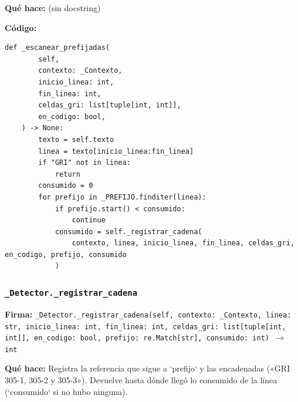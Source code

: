 \documentclass[11pt,a4paper]{article}
\begin{document}
\textbf{Qué hace:} (sin docstring)

\textbf{Código:}
\begin{lstlisting}
def _escanear_prefijadas(
        self,
        contexto: _Contexto,
        inicio_linea: int,
        fin_linea: int,
        celdas_gri: list[tuple[int, int]],
        en_codigo: bool,
    ) -> None:
        texto = self.texto
        linea = texto[inicio_linea:fin_linea]
        if "GRI" not in linea:
            return
        consumido = 0
        for prefijo in _PREFIJO.finditer(linea):
            if prefijo.start() < consumido:
                continue
            consumido = self._registrar_cadena(
                contexto, linea, inicio_linea, fin_linea, celdas_gri, en_codigo, prefijo, consumido
            )
\end{lstlisting}

\subsubsection*{\texttt{\_Detector.\_registrar\_cadena}}
\textbf{Firma:} \texttt{\_Detector.\_registrar\_cadena(self, contexto: \_Contexto, linea: str, inicio\_linea: int, fin\_linea: int, celdas\_gri: list[tuple[int, int]], en\_codigo: bool, prefijo: re.Match[str], consumido: int) $\rightarrow$ int}

\textbf{Qué hace:} Registra la referencia que sigue a `prefijo` y las encadenadas («GRI 305-1, 305-2 y 305-3»).
Devuelve hasta dónde llegó lo consumido de la línea (`consumido` si no hubo ninguna).
\end{document}
